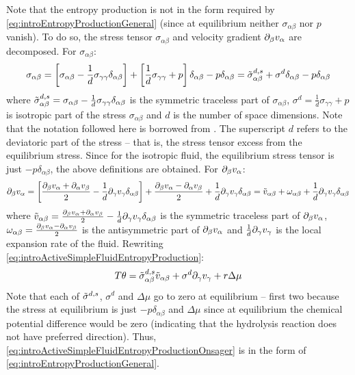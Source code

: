 Note that the entropy production is not in the form required by \autoref{eq:introEntropyProductionGeneral} (since at equilibrium neither $\sigma_{\alpha\beta}$ nor $p$ vanish). To do so, the stress tensor $\sigma_{\alpha\beta}$ and velocity gradient $\inlinePartial{\beta}{v_\alpha}$ are decomposed. For $\sigma_{\alpha\beta}$:
\begin{equation*}
    \sigma_{\alpha\beta} = \left[\sigma_{\alpha\beta} - \frac{1}{d}\sigma_{\gamma\gamma}\delta_{\alpha\beta}\right] + \left[\frac{1}{d}\sigma_{\gamma\gamma} + p\right]\delta_{\alpha\beta} - p\delta_{\alpha\beta} = \Tilde{\sigma}^{d,s}_{\alpha\beta} + \sigma^d\delta_{\alpha\beta} -p\delta_{\alpha\beta}
\end{equation*}
where $\Tilde{\sigma}^{d,s}_{\alpha\beta} = \sigma_{\alpha\beta} - \frac{1}{d}\sigma_{\gamma\gamma}\delta_{\alpha\beta}$ is the symmetric traceless part of $\sigma_{\alpha\beta}$, $\sigma^d = \frac{1}{d}\sigma_{\gamma\gamma} + p$ is isotropic part of the stress $\sigma_{\alpha\beta}$ and $d$ is the number of space dimensions. Note that the notation followed here is borrowed from \cite{julicher2018hydrodynamic}. The superscript $d$ refers to the deviatoric part of the stress -- that is, the stress tensor excess from the equilibrium stress. Since for the isotropic fluid, the equilibrium stress tensor is just $-p\delta_{\alpha\beta}$, the above definitions are obtained. For $\inlinePartial{\beta}{v_\alpha}$:
\begin{equation*}
    \inlinePartial{\beta}{v_\alpha} = \left[\frac{\inlinePartial{\beta}{v_\alpha} + \inlinePartial{\alpha}{v_\beta}}{2} - \frac{1}{d}\inlinePartial{\gamma}v_\gamma\delta_{\alpha\beta}\right] + \frac{\inlinePartial{\beta}{v_\alpha} - \inlinePartial{\alpha}{v_\beta}}{2} + \frac{1}{d}\inlinePartial{\gamma}v_\gamma\delta_{\alpha\beta} = \Tilde{v}_{\alpha\beta} + \omega_{\alpha\beta} + \frac{1}{d}\inlinePartial{\gamma}v_\gamma\delta_{\alpha\beta}
\end{equation*}
where $\Tilde{v}_{\alpha\beta} = \frac{\inlinePartial{\beta}{v_\alpha} + \inlinePartial{\alpha}{v_\beta}}{2} - \frac{1}{d}\inlinePartial{\gamma}v_\gamma\delta_{\alpha\beta}$ is the symmetric traceless part of $\inlinePartial{\beta}{v_\alpha}$, $\omega_{\alpha\beta} = \frac{\inlinePartial{\beta}{v_\alpha} - \inlinePartial{\alpha}{v_\beta}}{2}$ is the antisymmetric part of $\inlinePartial{\beta}{v_\alpha}$ and $\frac{1}{d}\inlinePartial{\gamma}v_\gamma$ is the local expansion rate of the fluid. Rewriting \autoref{eq:introActiveSimpleFluidEntropyProduction}:
\begin{equation}\label{eq:introActiveSimpleFluidEntropyProductionOnsager}
    T\theta = \Tilde{\sigma}^{d,s}_{\alpha\beta}\Tilde{v}_{\alpha\beta} + \sigma^d\inlinePartial{\gamma}v_\gamma + r\Delta\mu
\end{equation}
Note that each of $\Tilde{\sigma}^{d,s}$, $\sigma^d$ and $\Delta \mu$ go to zero at equilibrium -- first two because the stress at equilibrium is just $-p\delta_{\alpha\beta}$ and $\Delta \mu$ since at equilibrium the chemical potential difference would be zero (indicating that the hydrolysis reaction does not have preferred direction). Thus, \autoref{eq:introActiveSimpleFluidEntropyProductionOnsager} is in the form of \autoref{eq:introEntropyProductionGeneral}.

